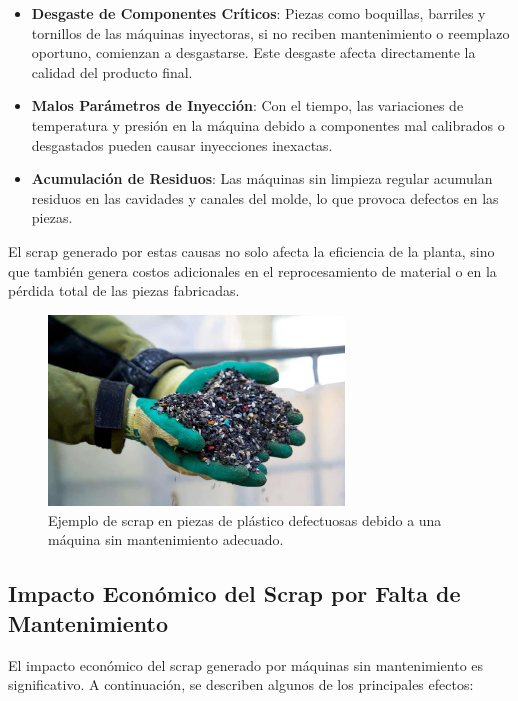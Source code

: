 \begin{itemize}
    \item \textbf{Desgaste de Componentes Críticos}: Piezas como boquillas, barriles y tornillos de las máquinas inyectoras, si no reciben mantenimiento o reemplazo oportuno, comienzan a desgastarse. Este desgaste afecta directamente la calidad del producto final.
    \item \textbf{Malos Parámetros de Inyección}: Con el tiempo, las variaciones de temperatura y presión en la máquina debido a componentes mal calibrados o desgastados pueden causar inyecciones inexactas.
    \item \textbf{Acumulación de Residuos}: Las máquinas sin limpieza regular acumulan residuos en las cavidades y canales del molde, lo que provoca defectos en las piezas.
\end{itemize}

El scrap generado por estas causas no solo afecta la eficiencia de la planta, sino que también genera costos adicionales en el reprocesamiento de material o en la pérdida total de las piezas fabricadas.

\begin{figure}[H]
\centering
\includegraphics[width=0.7\textwidth]{img/scrap.jpg}
\caption{Ejemplo de scrap en piezas de plástico defectuosas debido a una máquina sin mantenimiento adecuado.}
\label{fig:scrap_problem}
\end{figure}



\subsection{Impacto Económico del Scrap por Falta de Mantenimiento}

El impacto económico del scrap generado por máquinas sin mantenimiento es significativo. A continuación, se describen algunos de los principales efectos:

